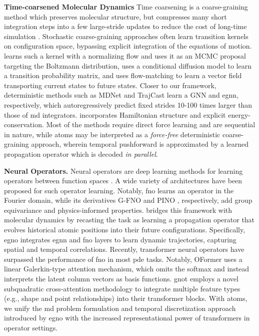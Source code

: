 {\textbf{Time-coarsened Molecular Dynamics}
Time coarsening is a coarse-graining method which preserves molecular structure, but compresses many short integration steps into a few large-stride updates to reduce the cost of long-time simulation \cite{kmiecik_coarse-grained_2016}.
Stochastic coarse-graining approaches often learn transition kernels on configuration space, bypassing explicit integration of the equations of motion. \textcite{klein_timewarp_2023} learns such a kernel with a normalizing flow and uses it as an MCMC proposal targeting the Boltzmann distribution, \textcite{hsu_score_2024} uses a conditional diffusion model to learn a transition probability matrix, and \textcite{yu_unisim_2025} uses flow-matching to learn a vector field transporting current states to future states.
Closer to our framework, deterministic methods such as MDNet \cite{zheng_learning_2021} and TrajCast \cite{thiemann2025force} learn a GNN and \gls{egnn}, respectively, which autoregressively predict fixed strides 10-100 times larger than those of \gls{md} integrators. \textcite{bigi_flashmd_2025} incorporates Hamiltonian structure and explicit energy-conservation. Most of the methods require direct force learning and are sequential in nature, while \Gls{atoms} may be interpreted as a \textit{force-free} deterministic coarse-graining approach, wherein temporal pushforward is approximated by a learned propagation operator which is decoded \textit{in parallel}.}

\textbf{Neural Operators.}
Neural operators are deep learning methods for learning operators between function spaces \cite{kovachki_neural_2021}. 
A wide variety of architectures have been proposed for such operator learning. Notably, \gls{fno} \cite{li_fourier_2021} learns an operator in the Fourier domain, while its derivatives G-FNO \cite{helwig_group_2023} and PINO \cite{li_physics-informed_2023}, respectively, add group equivariance and physics-informed properties. \citet{xu_equivariant_2024} bridges this framework with molecular dynamics by recasting the task as learning a propagation operator that evolves historical atomic positions into their future configurations. Specifically, \gls{egno} \cite{xu_equivariant_2024} integrates \gls{egnn} and \gls{fno} layers to learn dynamic trajectories, capturing spatial and temporal correlations.
Recently, transformer neural operators \cite{bryutkin_hamlet_2024,hao_gnot_2023,li_transformer_2023} have surpassed the performance of \gls{fno} in most \gls{pde} tasks. Notably, OFormer \cite{li_transformer_2023} uses a linear Galerkin-type attention mechanism, which omits the softmax and instead interprets the latent column vectors as basis functions. \gls{gnot} \cite{hao_gnot_2023} employs a novel subquadratic cross-attention methodology to integrate multiple feature types (e.g., shape and point relationships) into their transformer blocks. With \gls{atoms}, we unify the \gls{md} problem formulation and temporal discretization approach introduced by \gls{egno} with the increased representational power of transformers in operator settings.

